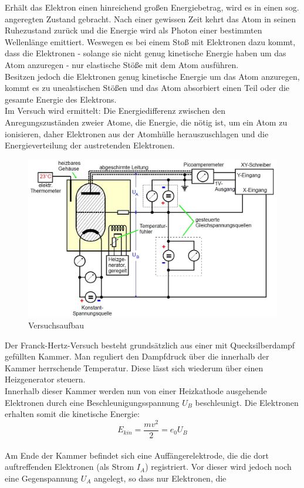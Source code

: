Erhält das Elektron einen hinreichend großen Energiebetrag, wird es in einen sog. angeregten Zustand gebracht. Nach einer gewissen Zeit kehrt das Atom in seinen Ruhezustand zurück und die Energie wird als Photon einer bestimmten Wellenlänge emittiert.
Weswegen es bei einem Stoß mit Elektronen dazu kommt, dass die Elektronen - solange sie nicht genug kinetische Energie haben um das Atom anzuregen - nur elastische Stöße mit dem Atom ausführen.\\
Besitzen jedoch die Elektronen genug kinetische Energie um das Atom anzuregen, kommt es zu unealstischen Stößen und das Atom absorbiert einen Teil oder die gesamte Energie des Elektrons.\\

Im Versuch wird ermittelt: Die Energiedifferenz zwischen den Anregungszuständen zweier Atome, die Energie, die nötig ist, um ein Atom zu ionisieren, daher Elektronen aus der Atomhülle herauszuschlagen und die Energieverteilung der austretenden Elektronen.

\begin{figure}[h]
	\centering
	\includegraphics[scale = 0.45]{Grafiken/V601_Abb1.jpg}
	\caption{Versuchsaufbau}
\end{figure}

Der Franck-Hertz-Versuch besteht grundsätzlich aus einer mit Quecksilberdampf gefüllten Kammer. Man reguliert den Dampfdruck über die innerhalb der Kammer herrschende Temperatur. Diese lässt sich wiederum über einen Heizgenerator steuern.\\
Innerhalb dieser Kammer werden nun von einer Heizkathode ausgehende Elektronen durch eine Beschleunigungsspannung $U_B$ beschleunigt. Die Elektronen erhalten somit die kinetische Energie:
\begin{equation}
E_{kin} = \frac{mv^2}{2} = e_0 U_B
\end{equation}
\\
Am Ende der Kammer befindet sich eine Auffängerelektrode, die die dort auftreffenden Elektronen (als Strom $I_A$) registriert. Vor dieser wird jedoch noch eine Gegenspannung $U_A$ angelegt, so dass nur Elektronen, die

